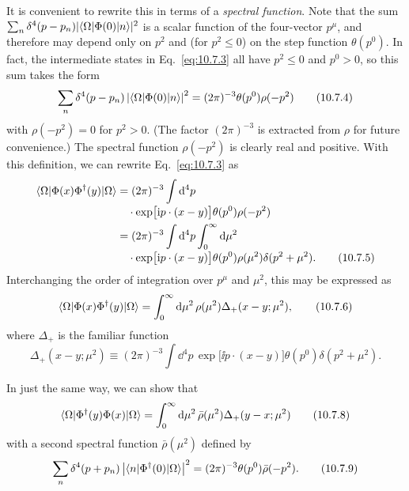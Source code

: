 It is convenient to rewrite this in terms of a \emph{spectral function}.
Note that the sum
$\sum_n\delta^4(p-p_n)|\langle \Omega\rvert\Phi(0)\lvert n\rangle|^2$ is a scalar function
of the four-vector $p^\mu$, and therefore may depend only on $p^2$ and
(for $p^2\leq0$) on the step function $\theta(p^0)$. In fact, the intermediate
states in Eq.~\eqref{eq:10.7.3} all have $p^2\leq0$ and $p^0>0$, so this sum
takes the form
\begin{equation}
  \sum_n\delta^4(p-p_n)
  \left|\langle \Omega\rvert\Phi(0)\lvert n\rangle\right|^2
  =(2\pi)^{-3}\theta(p^0)\rho(-p^2)
  \tag{10.7.4}\label{eq:10.7.4}
\end{equation}
with $\rho(-p^2)=0$ for $p^2>0$. (The factor $(2\pi)^{-3}$ is extracted
from $\rho$ for future convenience.) The spectral function $\rho(-p^2)$
is clearly real and positive. With this definition, we can rewrite
Eq.~\eqref{eq:10.7.3} as
\begin{align}
  \langle \Omega\rvert\Phi(x)\Phi^\dagger(y)\lvert \Omega\rangle
  &=(2\pi)^{-3}\int \mathop{}\!\mathrm{d}^4p\,\notag\\[-2pt]
  &\quad\cdot\exp\bigl[\mathrm{i} p\cdot(x-y)\bigr]\theta(p^0)\rho(-p^2)\notag\\
  &=(2\pi)^{-3}\int \mathop{}\!\mathrm{d}^4p\int_0^\infty \mathop{}\!\mathrm{d}\mu^2\,\notag\\[-2pt]
  &\quad\cdot
  \exp\bigl[\mathrm{i} p\cdot(x-y)\bigr]\theta(p^0)
  \rho(\mu^2)\delta(p^2+\mu^2).
  \tag{10.7.5}\label{eq:10.7.5}
\end{align}
Interchanging the order of integration over $p^\mu$ and $\mu^2$, this may
be expressed as
\begin{equation}
  \langle \Omega\rvert\Phi(x)\Phi^\dagger(y)\lvert \Omega\rangle
  =\int_0^\infty \mathop{}\!\mathrm{d}\mu^2\,\rho(\mu^2)\Delta_+(x-y;\mu^2),
  \tag{10.7.6}\label{eq:10.7.6}
\end{equation}
where $\Delta_+$ is the familiar function
\begin{equation}
  \Delta_+(x-y;\mu^2)\equiv(2\pi)^{-3}\int \dd^4p\,
  \exp\bigl[\ii p\cdot(x-y)\bigr]\theta(p^0)\delta(p^2+\mu^2).
  \tag{10.7.7}\label{eq:10.7.7}
\end{equation}

In just the same way, we can show that
\begin{equation}
  \langle \Omega\rvert\Phi^\dagger(y)\Phi(x)\lvert \Omega\rangle
  =\int_0^\infty \mathop{}\!\mathrm{d}\mu^2\,\bar\rho(\mu^2)\Delta_+(y-x;\mu^2)
  \tag{10.7.8}\label{eq:10.7.8}
\end{equation}
with a second spectral function $\bar\rho(\mu^2)$ defined by
\begin{equation}
  \sum_n\delta^4(p+p_n)
  \left|\langle n\rvert\Phi^\dagger(0)\lvert \Omega\rangle\right|^2
  =(2\pi)^{-3}\theta(p^0)\bar\rho(-p^2).
  \tag{10.7.9}\label{eq:10.7.9}
\end{equation}

